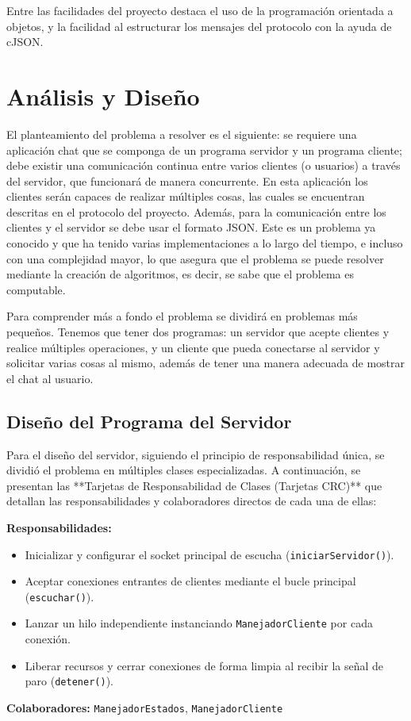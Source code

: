 \documentclass[11pt,a4paper]{article}
\begin{document}
Entre las facilidades del proyecto destaca el uso de la programación orientada a objetos, y la facilidad al estructurar los mensajes del protocolo con la ayuda de cJSON.

\section{Análisis y Diseño}

El planteamiento del problema a resolver es el siguiente: se requiere una aplicación chat que se componga de un programa servidor y un programa cliente; debe existir una comunicación continua entre varios clientes (o usuarios) a través del servidor, que funcionará de manera concurrente. En esta aplicación los clientes serán capaces de realizar múltiples cosas, las cuales se encuentran descritas en el protocolo del proyecto. Además, para la comunicación entre los clientes y el servidor se debe usar el formato JSON. Este es un problema ya conocido y que ha tenido varias implementaciones a lo largo del tiempo, e incluso con una complejidad mayor, lo que asegura que el problema se puede resolver mediante la creación de algoritmos, es decir, se sabe que el problema es computable.

Para comprender más a fondo el problema se dividirá en problemas más pequeños. Tenemos que tener dos programas: un servidor que acepte clientes y realice múltiples operaciones, y un cliente que pueda conectarse al servidor y solicitar varias cosas al mismo, además de tener una manera adecuada de mostrar el chat al usuario.

\subsection{Diseño del Programa del Servidor}

Para el diseño del servidor, siguiendo el principio de responsabilidad única, se dividió el problema en múltiples clases especializadas. A continuación, se presentan las **Tarjetas de Responsabilidad de Clases (Tarjetas CRC)** que detallan las responsabilidades y colaboradores directos de cada una de ellas:

\begin{tcolorbox}[colback=white,colframe=black,title=\textbf{Tarjeta CRC: Servidor}, fonttitle=\bfseries]
\textbf{Responsabilidades:}
\begin{itemize}
    \item Inicializar y configurar el socket principal de escucha (\texttt{iniciarServidor()}).
    \item Aceptar conexiones entrantes de clientes mediante el bucle principal (\texttt{escuchar()}).
    \item Lanzar un hilo independiente instanciando \texttt{ManejadorCliente} por cada conexión.
    \item Liberar recursos y cerrar conexiones de forma limpia al recibir la señal de paro (\texttt{detener()}).
\end{itemize}
\tcblower
\textbf{Colaboradores:} \texttt{ManejadorEstados}, \texttt{ManejadorCliente}
\end{tcolorbox}
\end{document}
